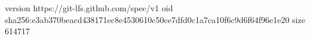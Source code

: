 version https://git-lfs.github.com/spec/v1
oid sha256:e3ab370beacd438171ec8e4530610c50ce7dfd0c1a7ca10f6c9d6f64f96e1e20
size 614717
